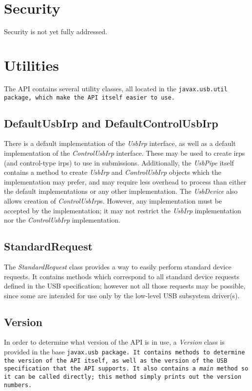\documentclass{article}
\newcommand{\myclass}[1]{\emph{#1}}
\newcommand{\myinterface}[1]{\emph{#1}}
\newcommand{\mypackage}[1]{\tt#1\rm}
\newcommand{\mymethod}[1]{\emph{#1}}
\newcommand{\mysectionend}[0]{\vfill\pagebreak[1]}
\begin{document}
\mysectionend

%

\section{Security}

Security is not yet fully addressed.

\mysectionend

%

\section{Utilities}

The API contains several utility classes, all located in the \mypackage{javax.usb.util}
package, which make the API itself easier to use.

\subsection{DefaultUsbIrp and DefaultControlUsbIrp}

There is a default implementation of the \myinterface{UsbIrp} interface, as well as a default
implementation of the \myinterface{ControlUsbIrp} interface.  These may be used to create irps
(and control-type irps) to use in submissions.  Additionally, the \myinterface{UsbPipe} itself
contains a method to create \myinterface{UsbIrp} and \myinterface{ControlUsbIrp} objects which
the implementation may prefer, and may require less overhead to process than either the default
implementations or any other implementation.  The \myinterface{UsbDevice} also allows creation of
\myinterface{ControlUsbIrp}s.  However, any implementation must be accepted by the implementation;
it may not restrict the \myinterface{UsbIrp} implementation nor the \myinterface{ControlUsbIrp}
implementation.

\subsection{StandardRequest}

The \myclass{StandardRequest} class provides a way to easily perform standard device requests.
It contains methods which correspond to all standard device requests defined in the USB
specification; however not all those requests may be possible, since some are intended for
use only by the low-level USB subsystem driver(s).

\subsection{Version}

In order to determine what version of the API is in use, a \myclass{Version} class is
provided in the base \mypackage{javax.usb} package.  It contains methods to determine
the version of the API itself, as well as the version of the USB specification
that the API supports.  It also contains a \mymethod{main} method so it can
be called directly; this method simply prints out the version numbers.

\mysectionend
\end{document}
